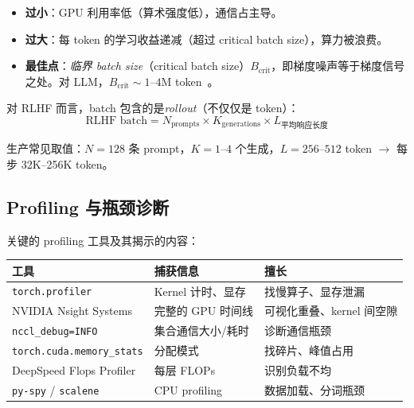 \begin{itemize}
  \item \textbf{过小}：GPU 利用率低（算术强度低），通信占主导。
  \item \textbf{过大}：每 token 的学习收益递减（超过 critical batch size），算力被浪费。
  \item \textbf{最佳点}：\emph{临界 batch size}（critical batch size）$B_\text{crit}$，即梯度噪声等于梯度信号之处。对 LLM，$B_\text{crit} \sim 1$--$4$M token~\cite{mccandlish2018empirical}。
\end{itemize}

对 RLHF 而言，batch 包含的是\emph{rollout}（不仅仅是 token）：
\begin{equation}
\text{RLHF batch} = N_\text{prompts} \times K_\text{generations} \times L_\text{平均响应长度}
\end{equation}

生产常见取值：$N=128$ 条 prompt，$K=1$--$4$ 个生成，$L=256$--$512$ token $\rightarrow$ 每步 32K--256K token。

\subsection{Profiling 与瓶颈诊断}
\label{profiling-and-bottleneck-diagnosis}

关键的 profiling 工具及其揭示的内容：

\begin{center}
\begin{tabular}{@{}l l l@{}}
\toprule
\textbf{工具} & \textbf{捕获信息} & \textbf{擅长} \\
\midrule
\texttt{torch.profiler} & Kernel 计时、显存 & 找慢算子、显存泄漏 \\
NVIDIA Nsight Systems & 完整的 GPU 时间线 & 可视化重叠、kernel 间空隙 \\
\texttt{nccl\_debug=INFO} & 集合通信大小/耗时 & 诊断通信瓶颈 \\
\texttt{torch.cuda.memory\_stats} & 分配模式 & 找碎片、峰值占用 \\
DeepSpeed Flops Profiler & 每层 FLOPs & 识别负载不均 \\
\texttt{py-spy} / \texttt{scalene} & CPU profiling & 数据加载、分词瓶颈 \\
\bottomrule
\end{tabular}
\end{center}

